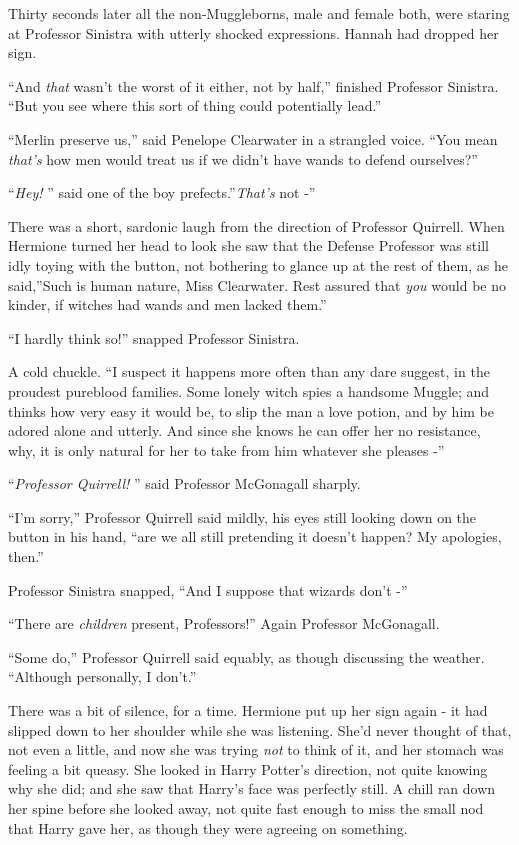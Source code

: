 Thirty seconds later all the non-Muggleborns, male and female both, were
staring at Professor Sinistra with utterly shocked expressions. Hannah
had dropped her sign.

``And \emph{that} wasn't the worst of it either, not by half,'' finished
Professor Sinistra. ``But you see where this sort of thing could
potentially lead.''

``Merlin preserve us,'' said Penelope Clearwater in a strangled voice.
``You mean \emph{that's} how men would treat us if we didn't have wands
to defend ourselves?''

``\emph{Hey!} '' said one of the boy prefects.''\emph{That's} not -''

There was a short, sardonic laugh from the direction of Professor
Quirrell. When Hermione turned her head to look she saw that the Defense
Professor was still idly toying with the button, not bothering to glance
up at the rest of them, as he said,''Such is human nature, Miss
Clearwater. Rest assured that \emph{you} would be no kinder, if witches
had wands and men lacked them.''

``I hardly think so!'' snapped Professor Sinistra.

A cold chuckle. ``I suspect it happens more often than any dare suggest,
in the proudest pureblood families. Some lonely witch spies a handsome
Muggle; and thinks how very easy it would be, to slip the man a love
potion, and by him be adored alone and utterly. And since she knows he
can offer her no resistance, why, it is only natural for her to take
from him whatever she pleases -''

``\emph{Professor Quirrell!} '' said Professor McGonagall sharply.

``I'm sorry,'' Professor Quirrell said mildly, his eyes still looking
down on the button in his hand, ``are we all still pretending it doesn't
happen? My apologies, then.''

Professor Sinistra snapped, ``And I suppose that wizards don't -''

``There are \emph{children} present, Professors!'' Again Professor
McGonagall.

``Some do,'' Professor Quirrell said equably, as though discussing the
weather. ``Although personally, I don't.''

There was a bit of silence, for a time. Hermione put up her sign again -
it had slipped down to her shoulder while she was listening. She'd never
thought of that, not even a little, and now she was trying \emph{not} to
think of it, and her stomach was feeling a bit queasy. She looked in
Harry Potter's direction, not quite knowing why she did; and she saw
that Harry's face was perfectly still. A chill ran down her spine before
she looked away, not quite fast enough to miss the small nod that Harry
gave her, as though they were agreeing on something.

